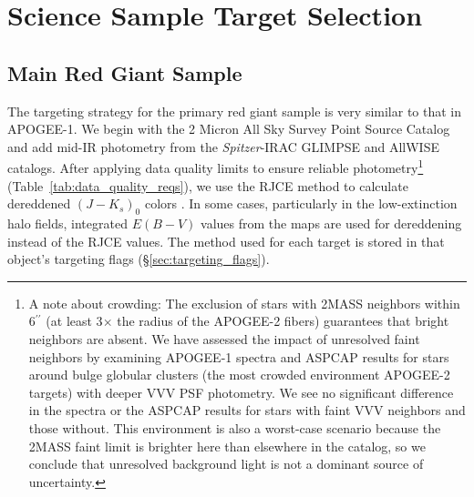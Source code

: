 \documentclass[12pt,twocolumn]{emulateapj}
\begin{document}
\section{Science Sample Target Selection} 

\subsection{Main Red Giant Sample}
\label{sec:main_sample}

The targeting strategy for the primary red giant sample is very similar to that in APOGEE-1. 
We begin with the 2 Micron All Sky Survey Point Source Catalog \citep[2MASS PSC;][]{Skrutskie_06_2mass} and 
add mid-IR photometry from the {\it Spitzer}-IRAC GLIMPSE \citep{Benjamin_05_glimpse,Churchwell_09_glimpses} and AllWISE \citep{Wright_10_WISE,Cutri_2013_allwise} catalogs.
After applying data quality limits to ensure reliable photometry\footnote{A note about crowding: The exclusion of stars with 2MASS neighbors within 6$^{\prime\prime}$ (at least 3$\times$ the radius of the APOGEE-2 fibers) guarantees that bright neighbors are absent. We have assessed the impact of unresolved faint neighbors by examining APOGEE-1 spectra and ASPCAP results for stars around bulge globular clusters (the most crowded environment APOGEE-2 targets) with deeper VVV PSF photometry.  We see no significant difference in the spectra or the ASPCAP results for stars with faint VVV neighbors and those without.  This environment is also a worst-case scenario because the 2MASS faint limit is brighter here than elsewhere in the catalog, so we conclude that unresolved background light is not a dominant source of uncertainty.} (Table~\ref{tab:data_quality_reqs}), 
we use the RJCE method to calculate dereddened $(J-K_s)_0$ colors \citep{Majewski_2011_RJCE}.  
In some cases, particularly in the low-extinction halo fields, integrated $E(B-V)$ values from the \citet[][hereafter SFD]{Schlegel_1998_dustmap} maps are used for dereddening instead of the RJCE values.
The method used for each target is stored in that object's targeting flags (\S\ref{sec:targeting_flags}).
\end{document}
